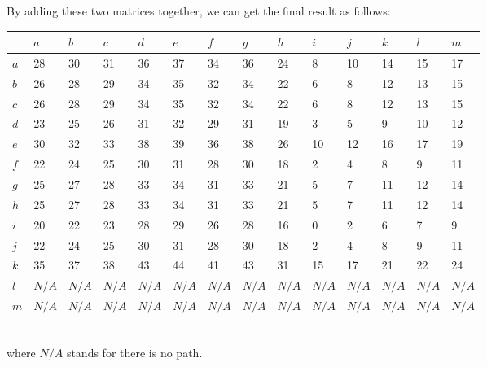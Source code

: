 \documentclass[11pt]{scrreprt}
\begin{document}
By adding these two matrices together, we can get the final result as follows:\\
\begin{tabularx}{\textwidth}{|l|X|X|X|X|X|X|X|X|X|X|X|X|X|}

\hline  	& $a$ &  $b$ & $c$ & $d$ & $e$ & $f$ & $g$ & $h$ & $i$  & $j$ & $k$ & $l$ & $m$\\
\hline $a$ &	28 &	30 &	31 &	36 &	37 &	34 &	36 &	24 &	8 &	10 &	14 &	15 &	17\\
\hline $b$ &	26 &	28 &	29 &	34 &	35 &	32 &	34 &	22 &	6 &	8 &	12 &	13 &	15\\
\hline $c$ &	26 &	28 &	29 &	34 &	35 &	32 &	34 &	22 &	6 &	8 &	12 &	13 &	15\\
\hline $d$ &	23 &	25 &	26 &	31 &	32 &	29 &	31 &	19 &	3 &	5 &	9 &	10 &	12\\
\hline $e$ &	30 &	32 &	33 &	38 &	39 &	36 &	38 &	26 &	10 &	12 &	16 &	17 &	19\\
\hline $f$ &	22 &	24 &	25 &	30 &	31 &	28 &	30 &	18 &	2 &	4 &	8 &	9 &	11\\
\hline $g$ &	25 &	27 &	28 &	33 &	34 &	31 &	33 &	21 &	5 &	7 &	11 &	12 &	14\\
\hline $h$ &	25 &	27 &	28 &	33 &	34 &	31 &	33 &	21 &	5 &	7 &	11 &	12 &	14\\
\hline $i$ &	20 &	22 &	23 &	28 &	29 &	26 &	28 &	16 &	0 &	2 &	6 &	7 &	9\\
\hline $j$ &	22 &	24 &	25 &	30 &	31 &	28 &	30 &	18 &	2 &	4 &	8 &	9 &	11\\
\hline $k$ &	35 &	37 &	38 &	43 &	44 &	41 &	43 &	31 &	15 &	17 &	21 &	22 &	24\\
\hline $l$ &	$N/A$ &	$N/A$ &	$N/A$ &	$N/A$ &	$N/A$ &	$N/A$ &	$N/A$ &	$N/A$ &	$N/A$ &	$N/A$ &	$N/A$ &	$N/A$ &	$N/A$\\
\hline $m$ &	$N/A$ &	$N/A$ &	$N/A$ &	$N/A$ &	$N/A$ &	$N/A$ &	$N/A$ &	$N/A$ &	$N/A$ &	$N/A$ &	$N/A$ &	$N/A$ &	$N/A$\\
\hline
\end{tabularx} \\

where $N/A$ stands for there is no path.
\end{document}
